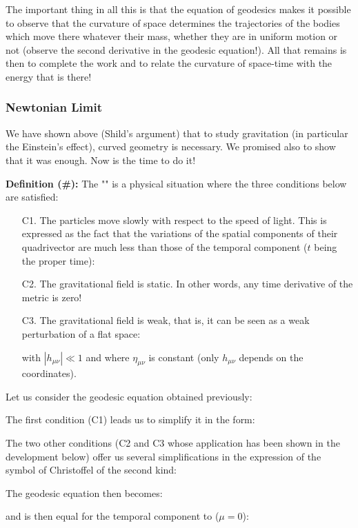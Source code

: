	The important thing in all this is that the equation of geodesics makes it possible to observe that the curvature of space determines the trajectories of the bodies which move there whatever their mass, whether they are in uniform motion or not (observe the second derivative in the geodesic equation!). All that remains is then to complete the work and to relate the curvature of space-time with the energy that is there!
	
	\subsubsection{Newtonian Limit}\label{newtonian limit}
	We have shown above (Shild's argument) that to study gravitation (in particular the Einstein's effect), curved geometry is necessary. We promised also to show that it was enough. Now is the time to do it!

	\textbf{Definition (\#\mydef):}  The "" is a physical situation where the three conditions below are satisfied:
	\begin{enumerate}
		\item[C1.] The particles move slowly with respect to the speed of light. This is expressed as the fact that the variations of the spatial components of their quadrivector are much less than those of the temporal component ($t$ being the proper time):
		

		\item[C2.] The gravitational field is static. In other words, any time derivative of the metric is zero!

		\item[C3.] The gravitational field is weak, that is, it can be seen as a weak perturbation of a flat space:
		
		with $|h_{\mu\nu}|\ll 1$ and where $\eta_{\mu\nu}$ is constant (only $h_{\mu\nu}$ depends on the coordinates).
	\end{enumerate}
	Let us consider the geodesic equation obtained previously:
	
	The first condition (C1) leads us to simplify it in the form:
	
	The two other conditions (C2 and C3 whose application has been shown in the development below) offer us several simplifications in the expression of the symbol of Christoffel of the second kind:
	
	The geodesic equation then becomes:
	
	and is then equal for the temporal component to ($\mu=0$):
	
